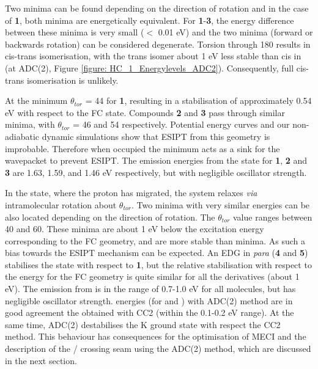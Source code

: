 Two \Estar{} minima can be found depending on the direction of rotation and in the case of \textbf{1}, both minima are energetically equivalent. For \textbf{1}-\textbf{3}, the energy difference between these minima is very small ($<$ 0.01 eV) and the two minima (forward or backwards rotation) can be considered degenerate. Torsion through 180\textdegree{} results in cis-trans isomerisation, with the trans isomer about 1 eV less stable than cis in \sone (at ADC(2), Figure \ref{figure: HC_1_Energylevels_ADC2}). Consequently, full cis-trans isomerisation is unlikely. 

At the \Estar{} minimum  $\theta_{tor}$ = 44\textdegree{} for \textbf{1}, resulting in  a stabilisation of approximately 0.54 eV with respect to the FC state. Compounds \textbf{2} and \textbf{3} pass through similar minima, with $\theta_{tor}$ = 46\textdegree{} and 54\textdegree{} respectively. Potential energy curves and our non-adiabatic dynamic simulations show that ESIPT from this geometry is improbable. Therefore when occupied the \Estar{} minimum acts as a sink for the wavepacket to prevent \ac{ESIPT}. The emission energies from the \Estar{} state for \textbf{1}, \textbf{2} and \textbf{3} are 1.63, 1.59, and 1.46 eV respectively, but with negligible oscillator strength.

In the \Kstar{} state, where the proton has migrated, the system relaxes \textit{via} intramolecular rotation about $\theta_{tor}$. Two minima with very similar energies can be also located depending on the direction of rotation. The $\theta_{tor}$ value ranges between 40\textdegree{} and 60\textdegree{}. These minima are about 1 eV below the excitation energy corresponding to the FC geometry, and are more stable than \Estar{} minima. As such a bias towards the ESIPT mechanism can be expected. An \ac{EDG} in \textit{para} (\textbf{4} and \textbf{5}) stabilises the \Kstar{} \sone{} state with respect to \textbf{1}, but the relative stabilisation with respect to the \sone{} energy for the FC geometry is quite similar for all the derivatives (about 1 eV). The emission from \Kstar{} is in the range of 0.7-1.0 eV for all molecules, but has negligible oscillator strength. \sone{} energies (for \Kstar{} and \Estar) with ADC(2) method are in good agreement the obtained with CC2 (within the 0.1-0.2 eV range). At the same time, ADC(2) destabilises the K ground state with respect the CC2 method. This behaviour has consequences for the optimisation of MECI and the description of the \sone/\szero{} crossing seam using the ADC(2) method, which are discussed in the next section.


